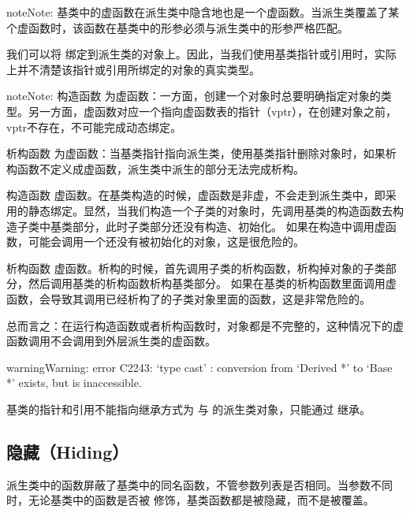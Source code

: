 \documentclass[letterpaper,10pt,english]{sphinxmanual}
\begin{document}
\begin{sphinxadmonition}{note}{Note:}
基类中的虚函数在派生类中隐含地也是一个虚函数。当派生类覆盖了某个虚函数时，该函数在基类中的形参必须与派生类中的形参严格匹配。

我们可以将  绑定到派生类的对象上。因此，当我们使用基类指针或引用时，实际上并不清楚该指针或引用所绑定的对象的真实类型。
\end{sphinxadmonition}

\begin{sphinxadmonition}{note}{Note:}
构造函数  为虚函数：一方面，创建一个对象时总要明确指定对象的类型。另一方面，虚函数对应一个指向虚函数表的指针（vptr），在创建对象之前，
vptr不存在，不可能完成动态绑定。

析构函数  为虚函数：当基类指针指向派生类，使用基类指针删除对象时，如果析构函数不定义成虚函数，派生类中派生的部分无法完成析构。

构造函数  虚函数。在基类构造的时候，虚函数是非虚，不会走到派生类中，即采用的静态绑定。显然，当我们构造一个子类的对象时，先调用基类的构造函数去构造子类中基类部分，此时子类部分还没有构造、初始化。
如果在构造中调用虚函数，可能会调用一个还没有被初始化的对象，这是很危险的。

析构函数  虚函数。析构的时候，首先调用子类的析构函数，析构掉对象的子类部分，然后调用基类的析构函数析构基类部分。
如果在基类的析构函数里面调用虚函数，会导致其调用已经析构了的子类对象里面的函数，这是非常危险的。

总而言之：在运行构造函数或者析构函数时，对象都是不完整的，这种情况下的虚函数调用不会调用到外层派生类的虚函数。
\end{sphinxadmonition}

\begin{sphinxadmonition}{warning}{Warning:}
error C2243: ‘type cast’ : conversion from ‘Derived *’ to ‘Base *’ exists, but is inaccessible.

基类的指针和引用不能指向继承方式为  与  的派生类对象，只能通过  继承。
\end{sphinxadmonition}


\subsection{隐藏（Hiding）}
\label{\detokenize{cpp/08_overload:hiding}}
派生类中的函数屏蔽了基类中的同名函数，不管参数列表是否相同。当参数不同时，无论基类中的函数是否被  修饰，基类函数都是被隐藏，而不是被覆盖。
\end{document}

